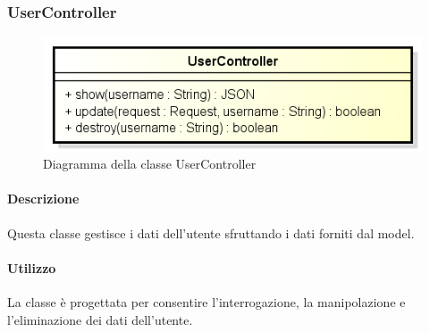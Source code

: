 \subsubsection{UserController}
\begin{figure}[h]
\centering
\includegraphics[width=0.8\linewidth]{img/back_end_http_controllers_userController}
\caption[Diagramma della classe UserController]{Diagramma della classe UserController}
\label{fig:back_end_http_controllers_userController}
\end{figure}

	\paragraph{Descrizione}
		Questa classe gestisce i dati dell'utente sfruttando i dati forniti dal model.
	\paragraph{Utilizzo}
		La classe è progettata per consentire l'interrogazione, la manipolazione e l'eliminazione dei dati dell'utente.

